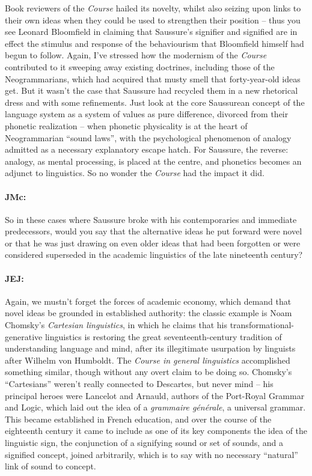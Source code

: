 \documentclass[output=paper]{langscibook}
\begin{document}
Book reviewers of the \textit{Course} hailed its novelty, whilst also seizing upon links to their own ideas when they could be used to strengthen their position – thus you see Leonard Bloomfield in \citeyear{bloomfield1924a} claiming that Saussure’s signifier and signified are in effect the stimulus and response of the behaviourism that Bloomfield himself had begun to follow. Again, I’ve stressed how the modernism of the \textit{Course} contributed to it sweeping away existing doctrines, including those of the Neogrammarians, which had acquired that musty smell that %
forty{}-year-old ideas get. But it wasn’t the case that Saussure had recycled them in a new rhetorical dress and with some refinements. Just look at the core Saussurean concept of the language system as a system of values as pure difference, divorced from their phonetic realization – when phonetic physicality is at the heart of Neogrammarian “sound laws”, with the psychological phenomenon of analogy admitted as a necessary explanatory escape hatch. For Saussure, the reverse: analogy, as mental processing, is placed at the centre, and phonetics becomes an adjunct to linguistics. So no wonder the \textit{Course} had the impact it did.


\paragraph*{JMc:}  So in these cases where Saussure broke with his contemporaries and immediate predecessors, would you say that the alternative ideas he put forward were novel or that he was just drawing on even older ideas that had been forgotten or were considered superseded in the academic linguistics of the late nineteenth century?


\paragraph*{JEJ:}  Again, we mustn’t forget the forces of academic economy, which demand that novel ideas be grounded in established authority: the classic example is Noam Chomsky’s \textit{Cartesian linguistics}, in which he claims that his trans\-for\-ma\-tion\-al-generative linguistics is restoring the great seventeenth-century tradition of understanding language and mind, after its illegitimate usurpation by linguists after Wilhelm von Humboldt. The \textit{Course in general linguistics} accomplished something similar, though without any overt claim to be doing so. Chomsky’s “Cartesians” weren’t really connected to Descartes, but never mind – his principal heroes were Lancelot and Arnauld, authors of the Port-Royal Grammar and Logic, which laid out the idea of a \textit{grammaire générale}, a universal grammar. This became established in French education, and over the course of the eighteenth century it came to include as one of its key components the idea of the linguistic sign, the conjunction of a signifying sound or set of sounds, and a signified concept, joined arbitrarily, which is to say with no necessary “natural” link of sound to concept.
\end{document}
